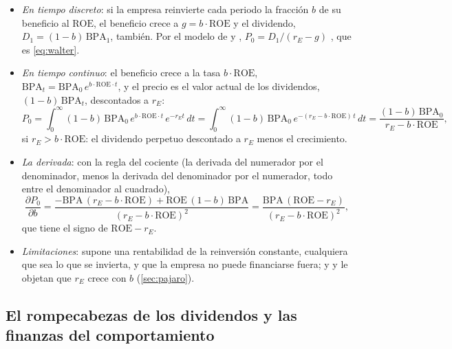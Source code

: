 \documentclass[11pt]{article}
\begin{document}
\begin{itemize}
\item \emph{En tiempo discreto}: si la empresa reinvierte cada periodo la fracción $b$ de su beneficio al $\mathrm{ROE}$, el beneficio crece a $g=b\cdot\mathrm{ROE}$ y el dividendo, $D_1=(1-b)\,\mathrm{BPA}_1$, también. Por el modelo de  y , $P_0=D_1/(r_E-g)$ , que es \eqref{eq:walter}.
\item \emph{En tiempo continuo}: el beneficio crece a la tasa $b\cdot\mathrm{ROE}$, $\mathrm{BPA}_t=\mathrm{BPA}_0\,e^{b\cdot\mathrm{ROE}\cdot t}$, y el precio es el valor actual de los dividendos, $(1-b)\,\mathrm{BPA}_t$, descontados a $r_E$:
  \[
  P_0=\int_0^{\infty}(1-b)\,\mathrm{BPA}_0\,e^{b\cdot\mathrm{ROE}\cdot t}\,e^{-r_E t}\,dt=\int_0^{\infty}(1-b)\,\mathrm{BPA}_0\,e^{-(r_E-b\cdot\mathrm{ROE})\,t}\,dt=\frac{(1-b)\,\mathrm{BPA}_0}{r_E-b\cdot\mathrm{ROE}},
  \]
  si $r_E>b\cdot\mathrm{ROE}$: el dividendo perpetuo descontado a $r_E$ menos el crecimiento.
\item \emph{La derivada}: con la regla del cociente (la derivada del numerador por el denominador, menos la derivada del denominador por el numerador, todo entre el denominador al cuadrado),
  \[
  \frac{\partial P_0}{\partial b}=\frac{-\mathrm{BPA}\,(r_E-b\cdot\mathrm{ROE})+\mathrm{ROE}\,(1-b)\,\mathrm{BPA}}{(r_E-b\cdot\mathrm{ROE})^2}=\frac{\mathrm{BPA}\,(\mathrm{ROE}-r_E)}{(r_E-b\cdot\mathrm{ROE})^2},
  \]
  que tiene el signo de $\mathrm{ROE}-r_E$.\findemo
\item \emph{Limitaciones}: supone una rentabilidad de la reinversión constante, cualquiera que sea lo que se invierta, y que la empresa no puede financiarse fuera; y  y  le objetan que $r_E$ crece con $b$ (\ref{sec:pajaro}).
\end{itemize}

\subsection{El rompecabezas de los dividendos y las finanzas del comportamiento}\label{anexo:conductual}
\end{document}
